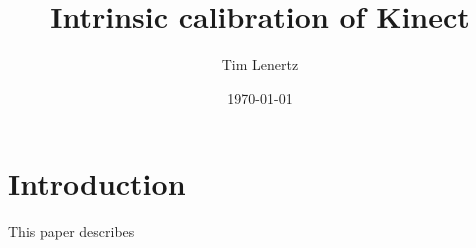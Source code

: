 \documentclass{scrartcl}
\title{Intrinsic calibration of Kinect}
\author{Tim Lenertz}
\date{\today}
\begin{document}
\maketitle

\section{Introduction}
This paper describes 
\end{document}
